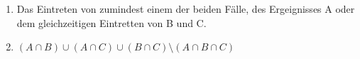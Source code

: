 \begin{enumerate}
	\item Das Eintreten von zumindest einem der beiden Fälle, des Ergeignisses A oder dem gleichzeitigen Eintretten von B und C.
	\item $ (A \cap B) \cup (A \cap C) \cup (B \cap C) \setminus (A \cap B \cap C) $
\end{enumerate}
